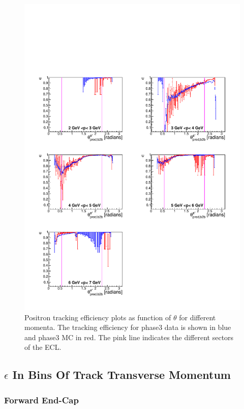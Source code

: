 \documentclass[a4paper,11pt,twosided,final,german,openbib,pdftex,listof=totoc,bibliography=totoc]{scrbook}
\begin{document}
\begin{figure}[!htbp]
	\centering
	\includegraphics[width=\textwidth]{Plots/master3/xPMThetaepP3}
	\caption[Momentum $\theta$ Positron Efficiency Phase3]{Positron tracking efficiency plots as function of $\theta$ for different  momenta. The tracking efficiency for phase3 data is shown in blue and phase3 MC in red. The pink line indicates the different sectors of the ECL.}
	\label{plt:xPMThetaep3}
\end{figure}

\newpage
\subsection{$\epsilon$ In Bins Of Track Transverse Momentum}

\subsubsection{Forward End-Cap}
\end{document}
